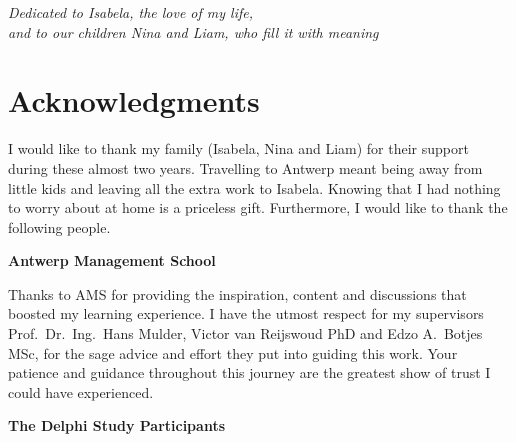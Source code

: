 \newpage\thispagestyle{empty}\mbox{}\newpage


\vspace*{7cm}

\begin{center}
{\large\textit{Dedicated to Isabela, the love of my life,\\and to our children Nina and Liam, who fill it with meaning}}
\end{center}

\newpage\thispagestyle{empty}\mbox{}\newpage

\section*{Acknowledgments}

\hspace{\parindent}I would like to thank my family (Isabela, Nina and Liam) for their support
during these almost two years. Travelling to Antwerp meant being away from
little kids and leaving all the extra work to Isabela. Knowing that I had
nothing to worry about at home is a priceless gift. Furthermore, I would like
to thank the following people.

\vspace{1em}
\noindent\textbf{Antwerp Management School}
\vspace{0.5em}

\noindent Thanks to AMS for providing the inspiration, content and discussions that
boosted my learning experience. I have the utmost respect for my supervisors
Prof.\ Dr.\ Ing.\ Hans Mulder, Victor van Reijswoud PhD and Edzo A.\ Botjes
MSc, for the sage advice and effort they put into guiding this work. Your
patience and guidance throughout this journey are the greatest show of trust I
could have experienced.

\vspace{1em}
\noindent\textbf{The Delphi Study Participants}
\vspace{0.5em}

